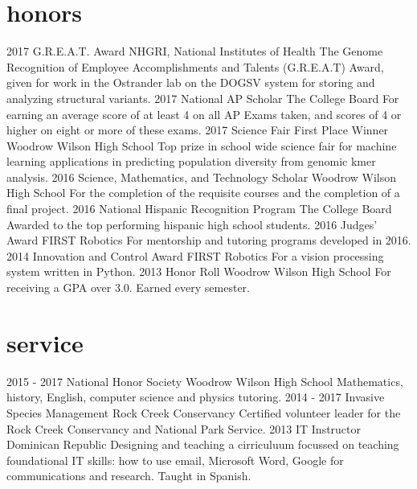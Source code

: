 \documentclass[]{friggeri-cv}
\begin{document}
\section{honors}
\begin{entrylist}
    \entry
    {2017}
    {G.R.E.A.T. Award}
    {NHGRI, National Institutes of Health}
    {The Genome Recognition of Employee Accomplishments and Talents (G.R.E.A.T) Award, given for work in the Ostrander lab on the DOGSV system for storing and analyzing structural variants.}
    \entry
    {2017}
    {National AP Scholar}
    {The College Board}
    {For earning an average score of at least 4 on all AP Exams taken, and scores of 4 or higher on eight or more of these exams.}
    \entry
    {2017}
    {Science Fair First Place Winner}
    {Woodrow Wilson High School}
    {Top prize in school wide science fair for machine learning applications in predicting population diversity from genomic kmer analysis.}
  \entry
    {2016}
    {Science, Mathematics, and Technology Scholar}
    {Woodrow Wilson High School}
    {For the completion of the requisite courses and the completion of a final project.}
  \entry
    {2016}
    {National Hispanic Recognition Program}
    {The College Board}
    {Awarded to the top performing hispanic high school students.}
  \entry
    {2016}
    {Judges' Award}
    {FIRST Robotics}
    {For mentorship and tutoring programs developed in 2016.}
  \entry
    {2014}
    {Innovation and Control Award}
    {FIRST Robotics}
    {For a vision processing system written in Python.}
  \entry
    {2013}
    {Honor Roll}
    {Woodrow Wilson High School}
    {For receiving a GPA over 3.0. Earned every semester.}
\end{entrylist}

\section{service}
\begin{entrylist}
  \entry
    {2015 - 2017}
    {National Honor Society}
    {Woodrow Wilson High School}
    {Mathematics, history, English, computer science and physics tutoring.}
  \entry
    {2014 - 2017}
    {Invasive Species Management}
    {Rock Creek Conservancy}
    {Certified volunteer leader for the Rock Creek Conservancy and National Park Service.}
  \entry
    {2013}
    {IT Instructor}
    {Dominican Republic}
    {Designing and teaching a cirriculuum focussed on teaching foundational IT skills: how to use email, Microsoft Word, Google for communications and research. Taught in Spanish.}
\end{entrylist}
\end{document}
